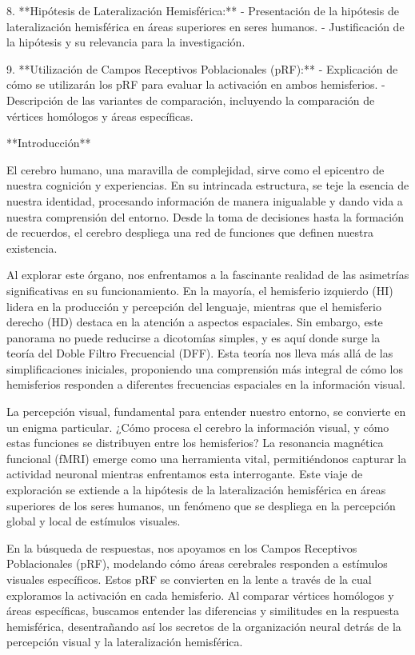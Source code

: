 \documentclass[12pt,oneside]{uhthesis}
\begin{document}
8. **Hipótesis de Lateralización Hemisférica:**
- Presentación de la hipótesis de lateralización hemisférica en áreas superiores en seres humanos.
- Justificación de la hipótesis y su relevancia para la investigación.

9. **Utilización de Campos Receptivos Poblacionales (pRF):**
- Explicación de cómo se utilizarán los pRF para evaluar la activación en ambos hemisferios.
- Descripción de las variantes de comparación, incluyendo la comparación de vértices homólogos y áreas específicas.

\newpage

**Introducción**

El cerebro humano, una maravilla de complejidad, sirve como el epicentro de nuestra cognición y experiencias. En su intrincada estructura, se teje la esencia de nuestra identidad, procesando información de manera inigualable y dando vida a nuestra comprensión del entorno. Desde la toma de decisiones hasta la formación de recuerdos, el cerebro despliega una red de funciones que definen nuestra existencia.

Al explorar este órgano, nos enfrentamos a la fascinante realidad de las asimetrías significativas en su funcionamiento. En la mayoría, el hemisferio izquierdo (HI) lidera en la producción y percepción del lenguaje, mientras que el hemisferio derecho (HD) destaca en la atención a aspectos espaciales. Sin embargo, este panorama no puede reducirse a dicotomías simples, y es aquí donde surge la teoría del Doble Filtro Frecuencial (DFF). Esta teoría nos lleva más allá de las simplificaciones iniciales, proponiendo una comprensión más integral de cómo los hemisferios responden a diferentes frecuencias espaciales en la información visual.

La percepción visual, fundamental para entender nuestro entorno, se convierte en un enigma particular. ¿Cómo procesa el cerebro la información visual, y cómo estas funciones se distribuyen entre los hemisferios? La resonancia magnética funcional (fMRI) emerge como una herramienta vital, permitiéndonos capturar la actividad neuronal mientras enfrentamos esta interrogante. Este viaje de exploración se extiende a la hipótesis de la lateralización hemisférica en áreas superiores de los seres humanos, un fenómeno que se despliega en la percepción global y local de estímulos visuales.

En la búsqueda de respuestas, nos apoyamos en los Campos Receptivos Poblacionales (pRF), modelando cómo áreas cerebrales responden a estímulos visuales específicos. Estos pRF se convierten en la lente a través de la cual exploramos la activación en cada hemisferio. Al comparar vértices homólogos y áreas específicas, buscamos entender las diferencias y similitudes en la respuesta hemisférica, desentrañando así los secretos de la organización neural detrás de la percepción visual y la lateralización hemisférica.
\end{document}

